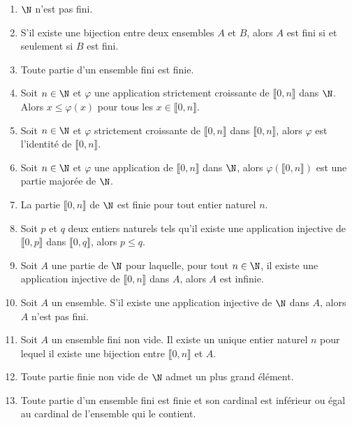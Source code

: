 \begin{enumerate}
\item $\N$ n'est pas fini.

\item  S'il existe une bijection entre deux ensembles $A$ et $B$, alors $A$ est fini si et seulement si $B$ est fini.

\item Toute partie d'un ensemble fini est finie.

\item  Soit $n\in \N$ et $\varphi$ une application strictement croissante de $\llbracket 0, n\rrbracket$ dans $\N$. Alors $x\leq \varphi(x)$ pour tous les $x\in \llbracket 0, n\rrbracket$.

\item  Soit $n\in\N$ et $\varphi$ strictement croissante de $\llbracket 0,n \rrbracket$ dans $\llbracket 0,n \rrbracket$, alors $\varphi$ est l'identité de $\llbracket 0,n \rrbracket$.

\item  Soit $n\in\N$ et $\varphi$ une application de $\llbracket 0,n \rrbracket$ dans $\N$, alors $\varphi(\llbracket 0,n \rrbracket)$ est une partie majorée de $\N$.

\item  La partie $\llbracket 0, n\rrbracket$ de $\N$ est finie pour tout entier naturel $n$.

\item   Soit $p$ et $q$ deux entiers naturels tels qu'il existe une application injective de $\llbracket 0,p \rrbracket$ dans $\llbracket 0,q \rrbracket$, alors $p\leq q$.

\item  Soit $A$ une partie de $\N$ pour laquelle, pour tout $n\in \N$, il existe une application injective de $\llbracket 0,n \rrbracket$ dans $A$, alors $A$ est infinie.

\item  Soit $A$ un ensemble. S'il existe une application injective de $\N$ dans $A$, alors $A$ n'est pas fini.

\item  Soit $A$ un ensemble fini non vide. Il existe un unique entier naturel $n$ pour lequel il existe une bijection entre $\llbracket 0, n\rrbracket$ et $A$.

\item Toute partie finie non vide de $\N$ admet un plus grand élément. 

\item Toute partie d'un ensemble fini est finie et son cardinal est inférieur ou égal au cardinal de l'ensemble qui le contient. 

\end{enumerate}
